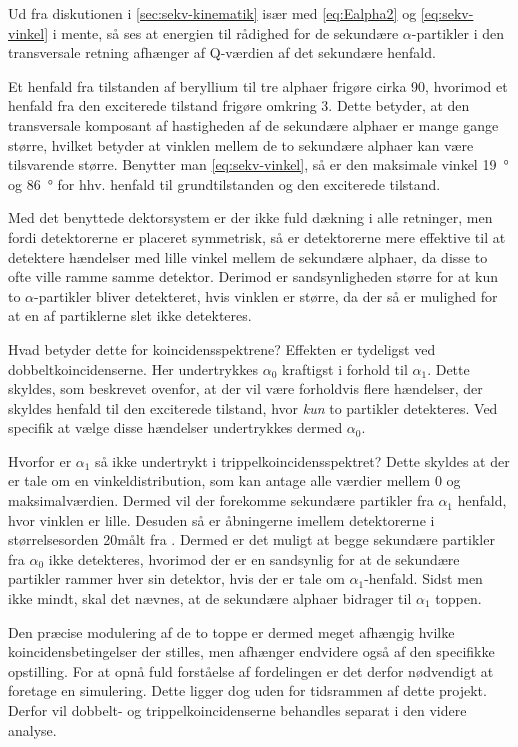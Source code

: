 Ud fra diskutionen i \cref{sec:sekv-kinematik} især med \cref{eq:Ealpha2} og \cref{eq:sekv-vinkel}
i mente, så ses at energien til rådighed for de sekundære $\alpha$-partikler i den transversale retning
afhænger af Q-værdien af det sekundære henfald.

Et henfald fra tilstanden af beryllium til tre alphaer frigøre cirka 90\keV, hvorimod et henfald fra
den exciterede tilstand frigøre omkring 3\MeV. Dette betyder, at den transversale komposant af
hastigheden af de sekundære alphaer er mange gange større, hvilket betyder at vinklen mellem de to
sekundære alphaer kan være tilsvarende større. Benytter man \cref{eq:sekv-vinkel}, så er den
maksimale vinkel \SI{19}{\degree} og \SI{86}{\degree} for hhv. henfald til grundtilstanden og den
exciterede tilstand. 

Med det benyttede dektorsystem er der ikke fuld dækning i alle retninger, men fordi detektorerne er
placeret symmetrisk, så er detektorerne mere effektive til at detektere hændelser med lille vinkel
mellem de sekundære alphaer, da disse to ofte ville ramme samme detektor. Derimod er sandsynligheden
større for at kun to $\alpha$-partikler bliver detekteret, hvis vinklen er større, da der så er mulighed
for at en af partiklerne slet ikke detekteres.

Hvad betyder dette for koincidensspektrene? Effekten er tydeligst ved dobbeltkoincidenserne. Her
undertrykkes $\alpha_{0}$ kraftigst i forhold til $\alpha_{1}$. Dette skyldes, som beskrevet ovenfor, at der
vil være forholdvis flere hændelser, der skyldes henfald til den exciterede tilstand, hvor \emph{kun} to
partikler detekteres. Ved specifik at vælge disse hændelser undertrykkes dermed $\alpha_{0}$.

Hvorfor er $\alpha_{1}$ så ikke undertrykt i trippelkoincidensspektret? Dette skyldes at der er tale om
en vinkeldistribution, som kan antage alle værdier mellem 0 og maksimalværdien. Dermed vil der
forekomme sekundære partikler fra $\alpha_{1}$ henfald, hvor vinklen er lille. Desuden så er åbningerne
imellem detektorerne i størrelsesorden 20\degree målt fra \target. Dermed er det muligt at begge
sekundære partikler fra $\alpha_{0}$ ikke detekteres, hvorimod der er en sandsynlig for at de sekundære
partikler rammer hver sin detektor, hvis der er tale om $\alpha_{1}$-henfald. Sidst men ikke mindt, skal
det nævnes, at de sekundære alphaer bidrager til $\alpha_{1}$ toppen. 

Den præcise modulering af de to toppe er dermed meget afhængig hvilke koincidensbetingelser der
stilles, men afhænger endvidere også af den specifikke opstilling. For at opnå fuld forståelse af
fordelingen er det derfor nødvendigt at foretage en simulering. Dette ligger dog uden for tidsrammen
af dette projekt. Derfor vil dobbelt- og trippelkoincidenserne behandles separat i den videre
analyse. 

